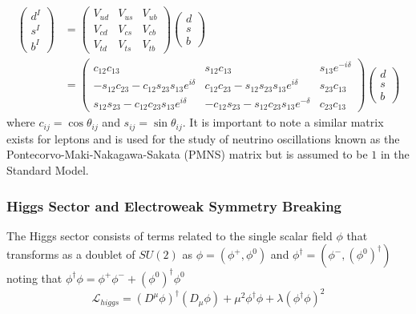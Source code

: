 \begin{align*}
\begin{pmatrix}  d^I \\ s^I \\ b^I \end{pmatrix} &=
 \begin{pmatrix} V_{ud} & V_{us} & V_{ub} \\ V_{cd} & V_{cs} & V_{cb} \\ V_{td} & V_{ts} & V_{tb} \end{pmatrix} 
\begin{pmatrix}  d \\ s \\ b \end{pmatrix}  \\
&= \begin{pmatrix} c_{12}c_{13} & s_{12} c_{13} & s_{13} e^{-i\delta} \\ 
-s_{12}c_{23} - c_{12}s_{23}s_{13}e^{i\delta} & c_{12} c_{23} - s_{12} s_{23} s_{13} e^{i\delta} & s_{23} c_{13} \\
s_{12}s_{23} - c_{12} c_{23} s_{13} e^{i\delta} & -c_{12}s_{23}-s_{12}c_{23}s_{13}e^{-\delta} & c_{23}c_{13}  \end{pmatrix} 
\begin{pmatrix}  d \\ s \\ b \end{pmatrix} 
\end{align*}
where $c_{ij} = \cos \theta_{ij}$ and $s_{ij} = \sin \theta_{ij}$. It is important to note a similar matrix exists for leptons and is used for the study of neutrino oscillations known as the Pontecorvo-Maki-Nakagawa-Sakata (PMNS) matrix but is assumed to be $1$ in the Standard Model. 

\subsubsection{Higgs Sector and Electroweak Symmetry Breaking} 

The Higgs sector consists of terms related to the single scalar field $\phi$ 
that transforms as a doublet of $SU(2)$ as $\phi = (\phi^+, \phi^0)$
 and $\phi^\dagger = (\phi^- , (\phi^0)^\dagger)$ noting that
 $\phi^\dagger \phi = \phi^+\phi^- + (\phi^0)^\dagger \phi^0$
\begin{equation}
\mathcal{L}_{higgs} = (D^\mu \phi)^\dagger(D_\mu \phi) + \mu^2 \phi^\dagger \phi + \lambda (\phi^\dagger \phi)^2 
\end{equation}

